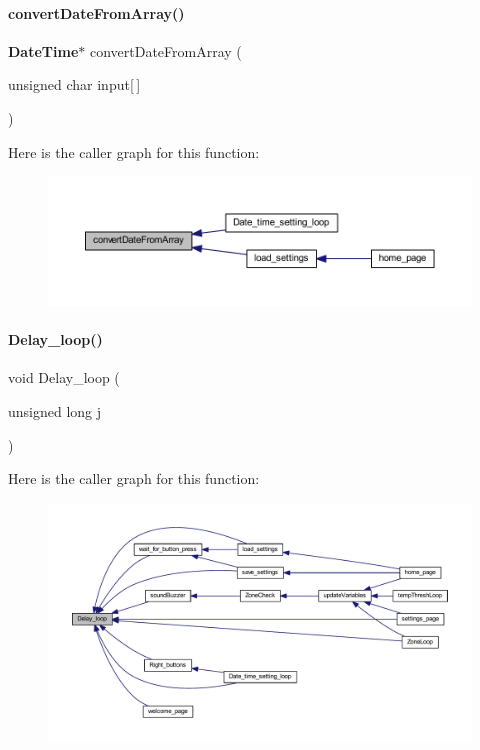 \paragraph{convert\+Date\+From\+Array()}
{\footnotesize\ttfamily \textbf{ Date\+Time}$\ast$ convert\+Date\+From\+Array (\begin{DoxyParamCaption}\item[{unsigned char}]{input[$\,$] }\end{DoxyParamCaption})}

Here is the caller graph for this function\+:
\nopagebreak
\begin{figure}[H]
\begin{center}
\leavevmode
\includegraphics[width=350pt]{a00023_abbe3f18b8a8d4112e5d5f3d1764ccabf_icgraph}
\end{center}
\end{figure}
\mbox{\label{a00023_a4ac586173db65fe258489805cd2a50a7}} 
\paragraph{Delay\+\_\+loop()}
{\footnotesize\ttfamily void Delay\+\_\+loop (\begin{DoxyParamCaption}\item[{unsigned long}]{j }\end{DoxyParamCaption})}

Here is the caller graph for this function\+:
\nopagebreak
\begin{figure}[H]
\begin{center}
\leavevmode
\includegraphics[width=350pt]{a00023_a4ac586173db65fe258489805cd2a50a7_icgraph}
\end{center}
\end{figure}
\mbox{\label{a00023_a8ac785f2d4c8d133c61c4e9be06cb606}} 
